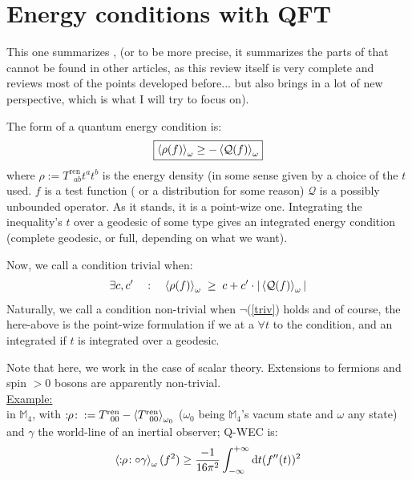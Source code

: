\documentclass[a4paper,11pt]{article}
\numberwithin{equation}{section}
\theoremstyle{definition}
\begin{document}
\section{Energy conditions with QFT}
This one summarizes \cite{EleRev}, (or to be more precise, it summarizes the parts of \cite{EleRev} that cannot be found in other articles, as this review itself is very complete and reviews most of the points developed before... but also brings in a lot of new perspective, which is what I will try to focus on).

The form of a quantum energy condition is:
\begin{equation}
\boxed{\braket{\rho(f)}_\omega \geq - \braket{\mathcal{Q}(f)}_\omega}
\end{equation}
where $\rho:=T^\mathrm{ren}_{\;\;ab}t^at^b$ is the energy density (in some sense given by a choice of the $t$ used. $f$ is a test function (\color{red} or a distribution for some reason\color{black}) $\mathcal{Q}$ is a possibly unbounded operator. As it stands, it is a point-wize one. Integrating the inequality's $t$ over a geodesic of some type gives an integrated energy condition (complete geodesic, or full, depending on what we want).

Now, we call a condition trivial when:
\begin{equation} \label{triv}
    \exists c, c' \quad : \quad \braket{\rho(f)}_\omega \; \geq \; c + c'\cdot|\braket{\mathcal{Q}(f)}_\omega|
\end{equation}
Naturally, we call a condition non-trivial when $\lnot$(\ref{triv}) holds and of course, the here-above is the point-wize formulation if we at a $\forall t$ to the condition, and an integrated if $t$ is integrated over a geodesic.

Note that here, we work in the case of scalar theory. Extensions to fermions and spin $>0$ bosons are apparently non-trivial. \\

\underline{Example:}\\
in $\mathbb{M}_4$, with $:\!\!\rho\!: \;\; := T^\mathrm{ren}_{\;\;00} - \braket{T^\mathrm{ren}_{\;\;00}}_{\omega_0}$ ($\omega_0$ being $\mathbb{M}_4$'s vacum state and $\omega$ any state) and $\gamma$ the world-line of an inertial observer; Q-WEC is:
\begin{equation}
    \braket{:\!\!\rho\!: \circ \gamma}_\omega(f^2) \geq \frac{-1}{16\pi^2} \int_{-\infty}^{+\infty}\mathrm{d}t (f''(t))^2
\end{equation}\\
\end{document}
